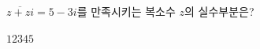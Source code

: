 $\overline{z+zi}=5-3i$를 만족시키는 복소수 $z$의 실수부분은? 
\begin{choices32}{$1$}{$2$}{$3$}{$4$}{$5$}\end{choices32}
